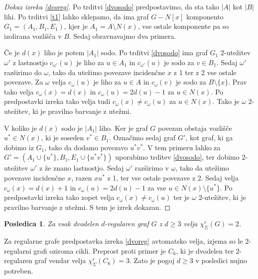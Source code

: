 \documentclass[12pt,a4paper,twoside]{article}
\theoremstyle{definition} %
\theoremstyle{plain} %
\newtheorem{posledica}[definicija]{Posledica}
\newcommand{\ec}{\chi_{\Sigma}^e}
\numberwithin{equation}{section}  %
\begin{document}
\begin{proof}[Dokaz izreka \ref{dvoreg}]
Po trditvi \ref{dvosodo} predpostavimo, da sta tako $|A|$ kot $|B|$ lihi.
Po trditvi \ref{t1} lahko sklepamo, da ima graf $G - N[x]$ komponento $G_1 = (A_1, B_1, E_1)$, kjer je $A_1 = A \setminus N(x)$, vse ostale komponente pa so izolirana vozlišča v $B$. Sedaj obravnavajmo dva primera.

Če je $d(x)$ liho je potem $|A_1|$ sodo. Po trditvi \ref{dvosodo} ima graf $G_1$ $2$-utežitev $\omega'$ z lastnostjo $c_{\omega'}(u)$ je liho za $u \in A_1$ in  $c_{\omega'}(u)$ je sodo za $v \in B_1$. Sedaj $\omega'$ razširimo do $\omega$, tako da utežimo povezave incidenčne $x$ z 1 ter z 2 vse ostale povezave. Za $\omega$ velja $c_{\omega}(u)$ je liho za $u \in A$  in $c_{\omega}(v)$ je sodo za $B \setminus \{x\}$. Prav tako velja $c_{\omega}(x) = d(x)$ in $c_{\omega}(u) = 2d(u) - 1$ za $u \in N(x)$. Po predpostavki izreka tako velja tudi $c_{\omega}(x) \neq c_{\omega}(u)$ za $u \in N(x)$. Tako je $\omega$ $2$-utežitev, ki je pravilno barvanje z utežmi.

V koliko je $d(x)$ sodo je $|A_1|$ liho. Ker je graf $G$ povezan obstaja vozlišče $u^* \in N(x)$, ki je soseden $v^* \in B_1$. Označimo sedaj graf $G'$, kot graf, ki ga dobimo iz $G_1$, tako da dodamo povezavo $u^*v^*$. V tem primeru lahko za $G' = (A_1 \cup \{u^*\}, B_1, E_1 \cup \{u^*v^*\})$ uporabimo trditev \ref{dvosodo}, ter dobimo $2$-utežitev $\omega'$ z že znano lastnostjo. Sedaj $\omega'$ razširimo v $\omega$, tako da utežimo povezave incidenčne $x$, razen $xu^*$ z 1, ter vse ostale povezave z 2. Sedaj velja $c_{\omega}(x) = d(x) + 1$ in $c_{\omega}(u) = 2d(u) - 1$ za vse $u \in N(x) \setminus \{u^*\}$. Po predpostavki izreka tako zopet velja $c_{\omega}(x) \neq c_{\omega}(u)$ ter je $\omega$ $2$-utežitev, ki je pravilno barvanje z utežmi. S tem je izrek dokazan.
\end{proof}
\begin{posledica}
\label{pos_dvo}
Za vsak dvodelen $d$-regularen graf $G$ z $d \ge 3$ velja $\ec(G) = 2$. 
\end{posledica}

Za regularne grafe predpostavka izreka \ref{dvoreg} avtomatsko velja, izjema so le $2$-regularni grafi oziroma cikli. Preprost proti primer je $C_6$, ki je dvodelen ter $2$-regularen graf vendar velja $\ec(C_6) = 3$. Zato je pogoj $d \ge 3$ v posledici nujno potreben.
\end{document}
